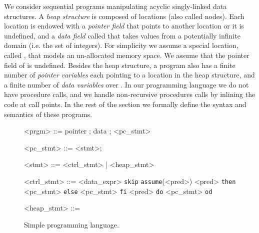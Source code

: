 \documentclass{llncs}
\begin{document}
We consider sequential programs manipulating acyclic singly-linked data structures. A {\em heap structure} is composed of locations (also called nodes). Each location is endowed  with a {\em pointer field}  that points to another location or it is undefined,  and a {\em data field} called  that takes values from a potentially infinite domain  (i.e. the set of integers). For simplicity we assume a special location, called , that models an un-allocated memory space. We assume that the  pointer field of  is undefined. Besides the heap structure, a program also has a finite number of {\em pointer variables} each pointing to a location in the heap structure, and a finite number of {\em data variables} over . In our programming language  we do not have procedure calls, and we handle non-recursive procedures calls by inlining the code at call points. In the rest of the section we formally define the syntax and semantics of these programs.



\begin{wrapfigure}[9]{r}[20pt]{83mm}
\vspace{-1.2cm}
  \centering
\scriptsize
  \begin{grammar}
    <prgm> ::=  pointer ; data ;  <pc\_stmt>
\vspace{-0.2cm}


    <pc\_stmt> ::=  <stmt>;
\vspace{-0.2cm}

      <stmt> ::= <ctrl\_stmt> | <heap\_stmt>
\vspace{-0.2cm}



     <ctrl\_stmt> ::= <data\_expr>  {\tt skip}
  {\tt assume}(<pred>)  <pred> {\tt then} <pc\_stmt> {\tt else} <pc\_stmt> {\tt fi}
 <pred> {\tt do} <pc\_stmt> {\tt od}

\vspace{-0.2cm}


     <heap\_stmt> ::= \mbox{}  \mbox{}    \mbox{} \alt \mbox{}  \mbox{}  \mbox{} \alt 

\end{grammar}
\vspace{-0.5cm}

\caption{Simple programming language.}
\label{grammar}
\end{wrapfigure}
\end{document}
